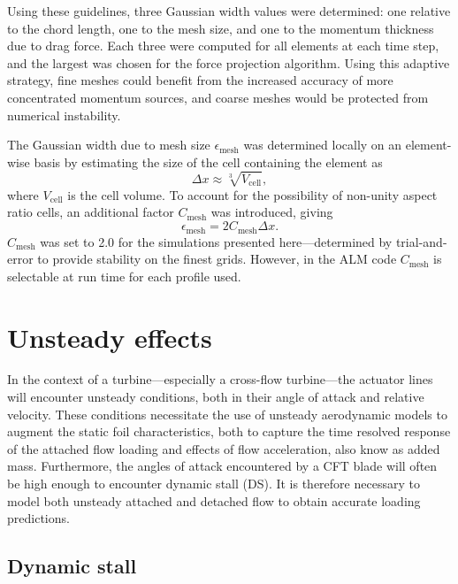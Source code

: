 \documentclass[times]{weauth}
\begin{document}
Using these guidelines, three Gaussian width values were determined: one
relative to the chord length, one to the mesh size, and one to the momentum
thickness due to drag force. Each three were computed for all elements at each
time step, and the largest was chosen for the force projection algorithm. Using
this adaptive strategy, fine meshes could benefit from the increased accuracy of
more concentrated momentum sources, and coarse meshes would be protected from
numerical instability.

The Gaussian width due to mesh size $\epsilon_{\mathrm{mesh}}$ was determined
locally on an element-wise basis by estimating the size of the cell containing
the element as
\begin{equation}
    \Delta x \approx \sqrt[3]{V_\mathrm{cell}},
\end{equation}
where $V_\mathrm{cell}$ is the cell volume. To account for the possibility of
non-unity aspect ratio cells, an additional factor $C_\mathrm{mesh}$ was
introduced, giving
\begin{equation}
    \epsilon_{\mathrm{mesh}} = 2C_\mathrm{mesh} \Delta x.
\end{equation}
$C_{\mathrm{mesh}}$ was set to 2.0 for the simulations presented
here---determined by trial-and-error to provide stability on the finest grids.
However, in the ALM code $C_{\mathrm{mesh}}$ is selectable at run time for each
profile used.


\section{Unsteady effects}

In the context of a turbine---especially a cross-flow turbine---the actuator
lines will encounter unsteady conditions, both in their angle of attack and
relative velocity. These conditions necessitate the use of unsteady aerodynamic
models to augment the static foil characteristics, both to capture the time
resolved response of the attached flow loading and effects of flow acceleration,
also know as added mass. Furthermore, the angles of attack encountered by a CFT
blade will often be high enough to encounter dynamic stall (DS). It is therefore
necessary to model both unsteady attached and detached flow to obtain accurate
loading predictions.


\subsection{Dynamic stall}
\end{document}
